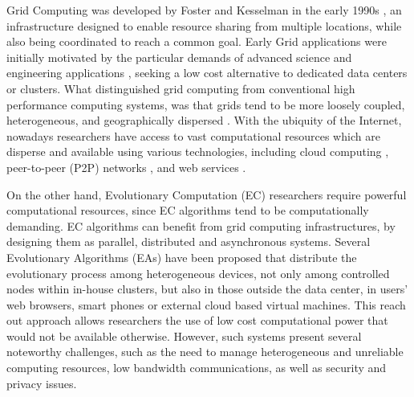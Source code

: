 Grid Computing was developed by Foster and Kesselman in the early 1990s \cite{Foster:1998}, an infrastructure designed to enable resource sharing from multiple locations, while also being coordinated to reach a common goal. Early Grid applications were initially motivated by the particular demands of advanced science and engineering applications \cite{Baxevanidis:2002}, seeking a low cost alternative to dedicated data centers or clusters. What distinguished grid computing from conventional high performance computing systems, was that grids tend to be more loosely coupled, heterogeneous, and geographically dispersed \cite{Foster:1998}. With the ubiquity of the Internet, nowadays researchers have access to vast  computational resources which are disperse and available using various technologies, including cloud computing \cite{cloud,varia2008cloud}, peer-to-peer (P2P) networks  \cite{Oram:2001}, and web services \cite{Curbera:2002}.

On the other hand, Evolutionary Computation (EC) researchers require powerful computational resources, since EC algorithms tend to be computationally demanding. EC algorithms can benefit from grid computing infrastructures, by designing them as parallel, distributed and asynchronous systems. Several Evolutionary Algorithms (EAs) have been proposed that distribute the evolutionary process among heterogeneous devices, not only among controlled nodes within in-house clusters, but also in those outside the data center, in users' web browsers, smart phones or external cloud based virtual machines. This reach out approach allows researchers the use of low cost computational power that would not be available otherwise.
However, such systems present several noteworthy challenges, such as the need to manage heterogeneous and unreliable computing resources,
low bandwidth communications, as well as security and privacy issues. 
 
